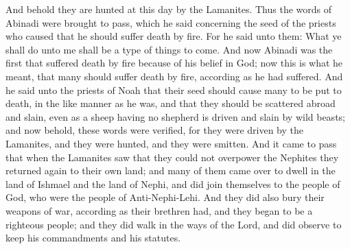 And behold they are hunted at this day by the Lamanites. Thus the words of Abinadi were brought to pass, which he said concerning the seed of the priests who caused that he should suffer death by fire.
\bverse \iffalse For he said unto them: What ye shall do unto me shall be a type of things to come. \fi
For he said unto them: What ye shall do unto me shall be a type of things to come.
\bverse \iffalse And now Abinadi was the first that suffered death by fire because of his belief in God; now this is what he meant, that many should suffer death by fire, according as he had suffered. \fi
And now Abinadi was the first that suffered death by fire because of his belief in God; now this is what he meant, that many should suffer death by fire, according as he had suffered.
\bverse \iffalse And he said unto the priests of Noah that their seed should cause many to be put to death, in the like manner as he was, and that they should be scattered abroad and slain, even as a sheep having no shepherd is driven and slain by wild beasts; and now behold, these words were verified, for they were driven by the Lamanites, and they were hunted, and they were smitten. \fi
And he said unto the priests of Noah that their seed should cause many to be put to death, in the like manner as he was, and that they should be scattered abroad and slain, even as a sheep having no shepherd is driven and slain by wild beasts; and now behold, these words were verified, for they were driven by the Lamanites, and they were hunted, and they were smitten.
\bverse \iffalse And it came to pass that when the Lamanites saw that they could not overpower the Nephites they returned again to their own land; and many of them came over to dwell in the land of Ishmael and the land of Nephi, and did join themselves to the people of God, who were the people of Anti-Nephi-Lehi. \fi
And it came to pass that when the Lamanites saw that they could not overpower the Nephites they returned again to their own land; and many of them came over to dwell in the land of Ishmael and the land of Nephi, and did join themselves to the people of God, who were the people of Anti-Nephi-Lehi.
\bverse \iffalse And they did also bury their weapons of war, according as their brethren had, and they began to be a righteous people; and they did walk in the ways of the Lord, and did observe to keep his commandments and his statutes. \fi
And they did also bury their weapons of war, according as their brethren had, and they began to be a righteous people; and they did walk in the ways of the Lord, and did observe to keep his commandments and his statutes.
